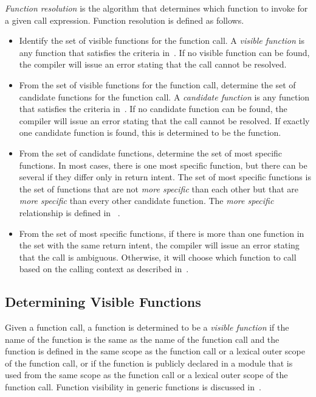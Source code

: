 \emph{Function resolution} is the algorithm that determines
which function to invoke for a given call expression.
Function resolution is defined as follows.
\begin{itemize}
\item
Identify the set of visible functions for the function call.  A
\emph{visible function} is any function that satisfies the criteria
in~.  If no visible function can
be found, the compiler will issue an error stating that the call
cannot be resolved.
\item
From the set of visible functions for the function call, determine the
set of candidate functions for the function call.  A \emph{candidate
function} is any function that satisfies the criteria
in~.  If no candidate function
can be found, the compiler will issue an error stating that the call
cannot be resolved.  If exactly one candidate function is found, this
is determined to be the function.
\item
From the set of candidate functions, determine the set of most specific
functions. In most cases, there is one most specific function, but there
can be several if they differ only in return intent. The set of most
specific functions is the set of functions that are not \emph{more
specific} than each other but that are \emph{more specific} than every
other candidate function. The \emph{more specific} relationship is
defined in ~.
\item
From the set of most specific functions, if there is more than one
function in the set with the same return intent, the compiler will issue
an error stating that the call is ambiguous. Otherwise, it will choose
which function to call based on the calling context as described
in~.
\end{itemize}

\subsection{Determining Visible Functions}
\label{Determining_Visible_Functions}

Given a function call, a function is determined to be a \emph{visible
function} if the name of the function is the same as the name of the
function call and the function is defined in the same scope as the
function call or a lexical outer scope of the function call, or if the
function is publicly declared in a module that is used from the same
scope as the function call or a lexical outer scope of the function
call.  Function visibility in generic functions is discussed
in~.

